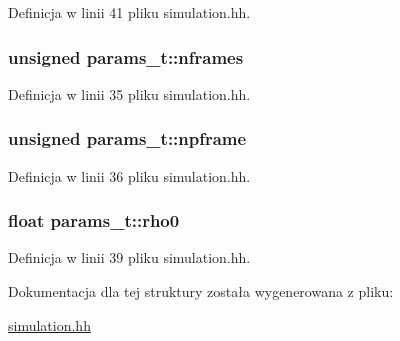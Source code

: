 Definicja w linii 41 pliku simulation.\-hh.

\hypertarget{structparams__t_a2cecc28f4ca024657cf567047e2aba59}{
\subsubsection[{nframes}]{\setlength{\rightskip}{0pt plus 5cm}unsigned params\-\_\-t\-::nframes}}\label{structparams__t_a2cecc28f4ca024657cf567047e2aba59}


Definicja w linii 35 pliku simulation.\-hh.

\hypertarget{structparams__t_a06a1a567fd5ba13905514227e2bb710a}{
\subsubsection[{npframe}]{\setlength{\rightskip}{0pt plus 5cm}unsigned params\-\_\-t\-::npframe}}\label{structparams__t_a06a1a567fd5ba13905514227e2bb710a}


Definicja w linii 36 pliku simulation.\-hh.

\hypertarget{structparams__t_a2eb309edb681d0a998f23fc692a73781}{
\subsubsection[{rho0}]{\setlength{\rightskip}{0pt plus 5cm}float params\-\_\-t\-::rho0}}\label{structparams__t_a2eb309edb681d0a998f23fc692a73781}


Definicja w linii 39 pliku simulation.\-hh.



Dokumentacja dla tej struktury została wygenerowana z pliku\-:\begin{DoxyCompactItemize}
\item 
\hyperlink{simulation_8hh}{simulation.\-hh}\end{DoxyCompactItemize}
